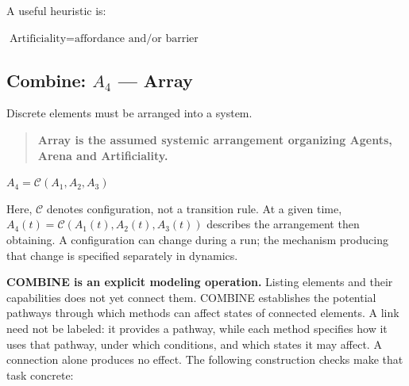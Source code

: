 \documentclass[11pt,a4paper]{article}
\newenvironment{fitdisplay}{\par\medskip\noindent\begin{lrbox}{\displaybox}$\displaystyle}{%
$\end{lrbox}\makebox[\linewidth][c]{\ifdim\wd\displaybox>\linewidth\resizebox{\linewidth}{!}{\usebox{\displaybox}}\else\usebox{\displaybox}\fi}\par\medskip}
\begin{document}
%

A useful heuristic is:
\begin{fitdisplay}
\boxed{\text{Artificiality}=\text{affordance and/or barrier}}
\end{fitdisplay}

\subsection{Combine: \(A_4\) --- Array}

Discrete elements must be arranged into a system.

\begin{quote}
\textbf{Array is the assumed systemic arrangement organizing Agents, Arena and Artificiality.}
\end{quote}

\begin{fitdisplay}
\boxed{
A_4=\mathcal C(A_1,A_2,A_3)
}
\end{fitdisplay}

Here, $\mathcal C$ denotes configuration, not a transition rule. At a given time, $A_4(t)=\mathcal C(A_1(t),A_2(t),A_3(t))$ describes the arrangement then obtaining. A configuration can change during a run; the mechanism producing that change is specified separately in dynamics.

\textbf{COMBINE is an explicit modeling operation.} Listing elements and their capabilities does not yet connect them. COMBINE establishes the potential pathways through which methods can affect states of connected elements. A link need not be labeled: it provides a pathway, while each method specifies how it uses that pathway, under which conditions, and which states it may affect. A connection alone produces no effect. The following construction checks make that task concrete:
\end{document}
